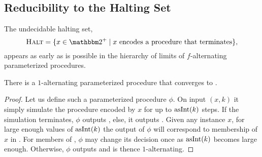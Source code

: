 \subsection{Reducibility to the Halting Set}
The undecidable halting set,
\begin{equation*}
  \pr{Halt} \deq \{x \in \binary^+ \st \text{$x$ encodes a procedure that terminates}\},
\end{equation*}
appears as early as is possible in the hierarchy of limits of $f$-alternating parameterized procedures.
\begin{lemma}
\label{lem:one_halting}
  There is a $1$-alternating parameterized procedure that converges to .
\end{lemma}
\begin{proof}
  Let us define such a parameterized procedure $\phi$.
  On input $(x, k)$ it simply simulate the procedure encoded by $x$ for up to $\operatorname{asInt}(k)$ steps.
  If the simulation terminates, $\phi$ outputs , else, it outputs .
  Given any instance $x$, for large enough values of $\operatorname{asInt}(k)$ the output of $\phi$ will correspond to membership of $x$ in .
  For members of , $\phi$ may change its decision once as $\operatorname{asInt}(k)$ becomes large enough.
  Otherwise, $\phi$ outputs  and is thence $1$-alternating.
\end{proof}

